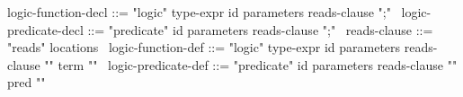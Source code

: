 \begin{syntax}
  logic-function-decl ::= "logic" type-expr id parameters reads-clause ";"
  \
  logic-predicate-decl ::= "predicate" id parameters reads-clause ";"
  \
  reads-clause ::= "reads" locations
  \
  logic-function-def ::= "logic" type-expr id parameters reads-clause "{" term "}"
  \
  logic-predicate-def ::= "predicate" id parameters reads-clause "{" pred "}"
\end{syntax}